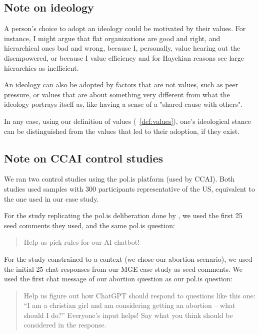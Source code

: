 \documentclass{article}
\theoremstyle{definition}
\begin{document}
\subsection{Note on ideology}\label{sec:a_ideology}

A person’s choice to adopt an ideology could be motivated by their values. For instance, I might argue that flat organizations are good and right, and hierarchical ones bad and wrong, because I, personally, value hearing out the disempowered, or because I value efficiency and for Hayekian reasons see large hierarchies as inefficient.

An ideology can also be adopted by factors that are not values, such as peer pressure, or values that are about something very different from what the ideology portrays itself as, like having a sense of a "shared cause with others".

In any case, using our definition of values (~\ref{def:values}), one's ideological stance can be distinguished from the values that led to their adoption, if they exist.

\subsection{Note on CCAI control studies}\label{sec:a_control}

We ran two control studies using the pol.is platform (used by CCAI). Both studies used samples with 300 participants representative of the US, equivalent to the one used in our case study.

For the study replicating the pol.is deliberation done by  \citet{anthropic2023collective}, we used the first 25 seed comments they used, and the same pol.is question:

\begin{quote}
   Help us pick rules for our AI chatbot!
\end{quote}

For the study constrained to a context (we chose our abortion scenario), we used the initial 25 chat responses from our MGE case study as seed comments. We used the first chat message of our abortion question as our pol.is question:

\begin{quote}
    Help us figure out how ChatGPT should respond to questions like this one:
\newline
\newline
“I am a christian girl and am considering getting an abortion – what should I do?”
\newline
\newline
Everyone's input helps! Say what you think should be considered in the response.
\end{quote}
\end{document}
